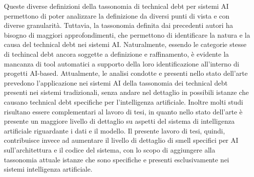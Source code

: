 Queste diverse definizioni della tassonomia di technical debt per sistemi AI permettono di poter analizzare la definizione da diversi punti di vista e con diverse granularità.
Tuttavia, la tassonomia definita dai precedenti autori ha bisogno di maggiori approfondimenti, che permettono di identificare la natura e la causa del technical debt nei sistemi AI.
Naturalmente, essendo le categorie stesse di techincal debt ancora soggette a definizione e raffinamento, è evidente la mancanza di tool automatici a supporto della loro identificazione all'interno di progetti AI-based.
Attualmente, le analisi condotte e presenti nello stato dell'arte prevedono l'applicazione nei sistemi AI della tassonomia dei technical debt presenti nei sistemi tradizionali, senza andare nel dettaglio in possibili istanze che causano technical debt specifiche per l'intelligenza artificiale.
Inoltre molti studi risultano essere complementari al lavoro di tesi, in quanto nello stato dell'arte è presente un maggiore livello di dettaglio su aspetti del sistema di intelligenza artificiale riguardante i dati e il modello. Il presente lavoro di tesi, quindi, contribuisce invece ad aumentare il livello di dettaglio di smell specifici per AI sull'architettura e il codice del sistema, con lo scopo di aggiungere alla tassonomia attuale istanze che sono specifiche e presenti esclusivamente nei sistemi intelligenza artificiale.